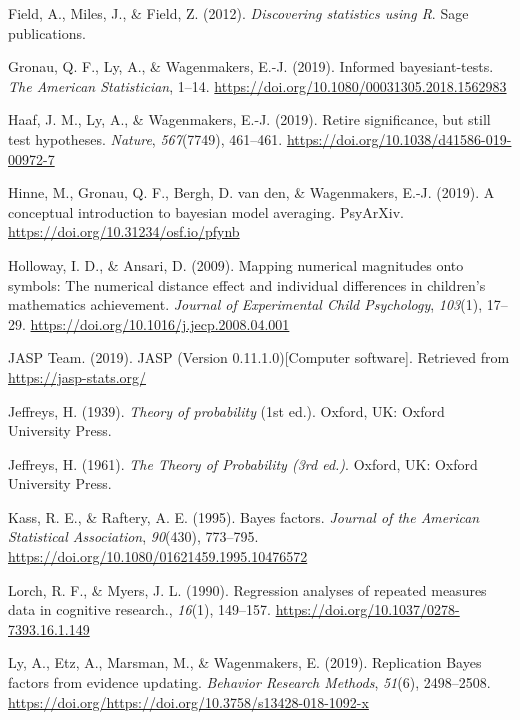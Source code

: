 \documentclass[english,,doc,floatsintext]{apa6}
\begin{document}
\leavevmode\hypertarget{ref-field2012discovering}{}%
Field, A., Miles, J., \& Field, Z. (2012). \emph{Discovering statistics using R}. Sage publications.

\leavevmode\hypertarget{ref-gronau2019}{}%
Gronau, Q. F., Ly, A., \& Wagenmakers, E.-J. (2019). Informed bayesiant-tests. \emph{The American Statistician}, 1--14. \url{https://doi.org/10.1080/00031305.2018.1562983}

\leavevmode\hypertarget{ref-haaf2019}{}%
Haaf, J. M., Ly, A., \& Wagenmakers, E.-J. (2019). Retire significance, but still test hypotheses. \emph{Nature}, \emph{567}(7749), 461--461. \url{https://doi.org/10.1038/d41586-019-00972-7}

\leavevmode\hypertarget{ref-hinneBMA}{}%
Hinne, M., Gronau, Q. F., Bergh, D. van den, \& Wagenmakers, E.-J. (2019). A conceptual introduction to bayesian model averaging. PsyArXiv. \url{https://doi.org/10.31234/osf.io/pfynb}

\leavevmode\hypertarget{ref-hollowayAnsari2009}{}%
Holloway, I. D., \& Ansari, D. (2009). Mapping numerical magnitudes onto symbols: The numerical distance effect and individual differences in children's mathematics achievement. \emph{Journal of Experimental Child Psychology}, \emph{103}(1), 17--29. \url{https://doi.org/10.1016/j.jecp.2008.04.001}

\leavevmode\hypertarget{ref-jaspSoftware}{}%
JASP Team. (2019). JASP (Version 0.11.1.0){[}Computer software{]}. Retrieved from \url{https://jasp-stats.org/}

\leavevmode\hypertarget{ref-jeffreys1939theory1}{}%
Jeffreys, H. (1939). \emph{Theory of probability} (1st ed.). Oxford, UK: Oxford University Press.

\leavevmode\hypertarget{ref-jeffreys1961}{}%
Jeffreys, H. (1961). \emph{The Theory of Probability (3rd ed.)}. Oxford, UK: Oxford University Press.

\leavevmode\hypertarget{ref-kass1995}{}%
Kass, R. E., \& Raftery, A. E. (1995). Bayes factors. \emph{Journal of the American Statistical Association}, \emph{90}(430), 773--795. \url{https://doi.org/10.1080/01621459.1995.10476572}

\leavevmode\hypertarget{ref-lorch1990}{}%
Lorch, R. F., \& Myers, J. L. (1990). Regression analyses of repeated measures data in cognitive research., \emph{16}(1), 149--157. \url{https://doi.org/10.1037/0278-7393.16.1.149}

\leavevmode\hypertarget{ref-ly2019replication}{}%
Ly, A., Etz, A., Marsman, M., \& Wagenmakers, E. (2019). Replication Bayes factors from evidence updating. \emph{Behavior Research Methods}, \emph{51}(6), 2498--2508. \url{https://doi.org/https://doi.org/10.3758/s13428-018-1092-x}
\end{document}
